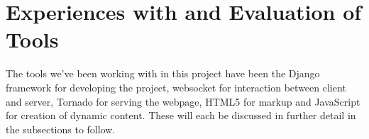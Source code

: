 \section{Experiences with and Evaluation of Tools}
The tools we've been working with in this project have been the Django framework for developing the project, websocket for interaction between client and server, Tornado for serving the webpage, HTML5 for markup and JavaScript for creation of dynamic content. These will each be discussed in further detail in the subsections to follow.




